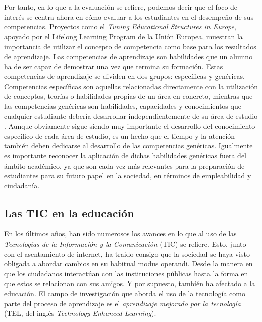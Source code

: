 Por tanto, en lo que a la evaluación se refiere, podemos decir que el foco de interés se centra ahora en cómo evaluar a los estudiantes en el desempeño de sus competencias. Proyectos como el \emph{Tuning Educational Structures in Europe}, apoyado por el Lifelong Learning Program de la Unión Europea, muestran la importancia de utilizar el concepto de competencia como base para los resultados de aprendizaje. Las competencias de aprendizaje son habilidades que un alumno ha de ser capaz de demostrar una vez que termina su formación. Estas competencias de aprendizaje se dividen en dos grupos: específicas y genéricas. Competencias específicas son aquellas relacionadas directamente con la utilización de conceptos, teorías o habilidades propias de un área en concreto, mientras que las competencias genéricas son habilidades, capacidades y conocimientos que cualquier estudiante debería desarrollar independientemente de su área de estudio \cite{gonzalez2003tuning}. Aunque obviamente sigue siendo muy importante el desarrollo del conocimiento específico de cada área de estudio, es un hecho que el tiempo y la atención también deben dedicarse al desarrollo de las competencias genéricas. Igualmente es importante reconocer la aplicación de dichas habilidades genéricas fuera del ámbito académico, ya que son cada vez más relevantes para la preparación de estudiantes para su futuro papel en la sociedad, en términos de empleabilidad y ciudadanía.

\subsection*{Las TIC en la educación}

En los últimos años, han sido numerosos los avances en lo que al uso de las \emph{Tecnologías de la Información y la Comunicación} (TIC) se refiere. Esto, junto con el asentamiento de internet, ha traido consigo que la sociedad se haya visto obligada a abordar cambios en su habitual modus operandi. Desde la manera en que los ciudadanos interactúan con las instituciones públicas hasta la forma en que estos se relacionan con sus amigos. Y por supuesto, también ha afectado a la educación. El campo de investigación que aborda el uso de la tecnología como parte del proceso de aprendizaje es el \emph{aprendizaje mejorado por la tecnología} (TEL, del inglés \emph{Technology Enhanced Learning}).

